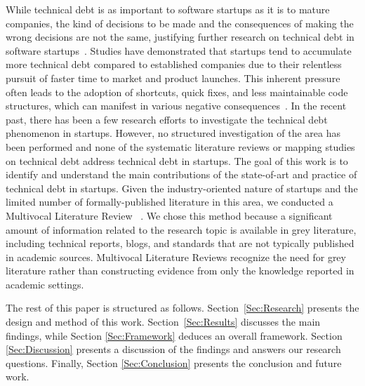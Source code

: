 While technical debt is as important to software startups as it is to mature companies, the kind of decisions to be made and the consequences of making the wrong decisions are not the same, justifying further research on technical debt in software startups~\cite{Unterkalmsteiner16}.
Studies have demonstrated that startups tend to accumulate more technical debt compared to established companies due to their relentless pursuit of faster time to market and product launches.
This inherent pressure often leads to the adoption of shortcuts, quick fixes, and less maintainable code structures, which can manifest in various negative consequences~\cite{Giardino2016,Klotins882019}.
In the recent past, there has been a few research efforts to investigate the technical debt phenomenon in startups.
However, no structured investigation of the area has been performed and none of the systematic literature reviews or mapping studies on technical debt address technical debt in startups.
The goal of this work is to identify and understand the main contributions of the state-of-art and practice of technical debt in startups.
Given the industry-oriented nature of startups and the limited number of formally-published literature in this area, we conducted a Multivocal Literature Review ~\cite{GAROUSI2019101}.
We chose this method because a significant amount of information related to the research topic is available in grey literature, including technical reports, blogs, and standards that are not typically published in academic sources.
Multivocal Literature Reviews recognize the need for grey literature rather than constructing evidence from only the knowledge reported in academic settings.




The rest of this paper is structured as follows.
Section~\ref{Sec:Research} presents the design and method of this work.
Section~\ref{Sec:Results} discusses the main findings, while Section \ref{Sec:Framework} deduces an overall framework. Section \ref{Sec:Discussion} presents a discussion of the findings and answers our research questions.
Finally, Section \ref{Sec:Conclusion} presents the conclusion and future work.

